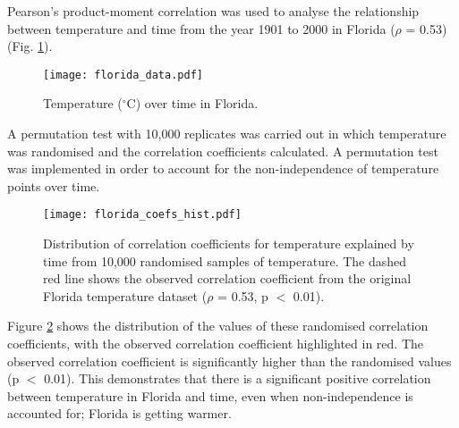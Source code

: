 \documentclass[12pt]{article}
\title{\vspace{-1.5em}{Is Florida getting warmer?\vspace{-2em}}}
\date{}
\author{}
\begin{document}
    \maketitle

    \thispagestyle{fancy}

    Pearson's product-moment correlation was used to analyse the relationship between temperature and time from the year 1901 to 2000 in Florida ($\rho$ = 0.53) (Fig. \ref{fig:florida_data}).
    
    \begin{figure}[h!]
        \centering
        \texttt{[image: florida\_data.pdf]}
        \caption{Temperature ($^{\circ}$C) over time in Florida.}
        \label{fig:florida_data}
    \end{figure}

    A permutation test with 10,000 replicates was carried out in which temperature was randomised and the correlation coefficients calculated. A permutation test was implemented in order to account for the non-independence of temperature points over time.

    \begin{figure}[h!]
        \centering
        \texttt{[image: florida\_coefs\_hist.pdf]}
        \caption{Distribution of correlation coefficients for temperature explained by time from 10,000 randomised samples of temperature. The dashed red line shows the observed correlation coefficient from the original Florida temperature dataset ($\rho$ = 0.53, p $<$ 0.01).}
        \label{fig:coefs_hist}
    \end{figure}

    Figure \ref{fig:coefs_hist} shows the distribution of the values of these randomised correlation coefficients, with the observed correlation coefficient highlighted in red. The observed correlation coefficient is significantly higher than the randomised values (p $<$ 0.01). This demonstrates that there is a significant positive correlation between temperature in Florida and time, even when non-independence is accounted for; Florida is getting warmer.
\end{document}
